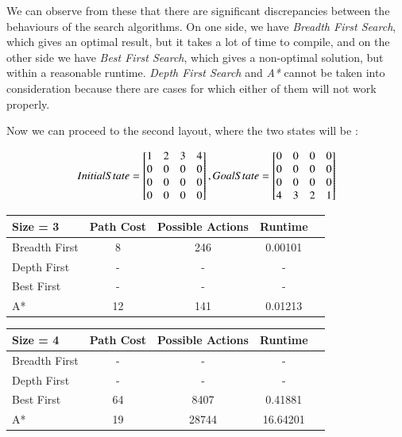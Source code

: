 \documentclass{article}
\begin{document}
\bigskip

We can observe from these that there are significant discrepancies between the behaviours of the search algorithms. On one side, we have \emph{Breadth First Search}, which gives an optimal result, but it takes a lot of time to compile, and on the other side we have \emph{Best First Search}, which gives a non-optimal solution, but within a reasonable runtime. \emph{Depth First Search} and \emph{A*} cannot be taken into consideration because there are cases for which either of them will not work properly.

Now we can proceed to the second layout, where the two states will be :

\begin{center}
    

\[ InitialState = 
\begin{bmatrix}
1 & 2 & 3 & 4\\
0 & 0 & 0 & 0\\
0 & 0 & 0 & 0\\
0 & 0 & 0 & 0\\
\end{bmatrix}
,\space \space  GoalState =  
\begin{bmatrix}
0 & 0 & 0 & 0\\
0 & 0 & 0 & 0\\
0 & 0 & 0 & 0\\
4 & 3 & 2 & 1\\
\end{bmatrix}
\]

\begin{tabular}{l*{3}{c}r}
Size = 3 & Path Cost & Possible Actions & Runtime\\
\hline
Breadth First   & 8 & 246 & 0.00101   \\
Depth First     & - & - & -   \\
Best First      & - & - & -  \\
A*              & 12 & 141 & 0.01213   \\
\end{tabular}

\bigskip

\begin{tabular}{l*{3}{c}r}
Size = 4 & Path Cost & Possible Actions & Runtime\\
\hline
Breadth First   & - & - & -   \\
Depth First     & - & - & -   \\
Best First      & 64 & 8407 & 0.41881 \\
A*              & 19 & 28744 & 16.64201  \\
\end{tabular}

\end{center}
\end{document}
